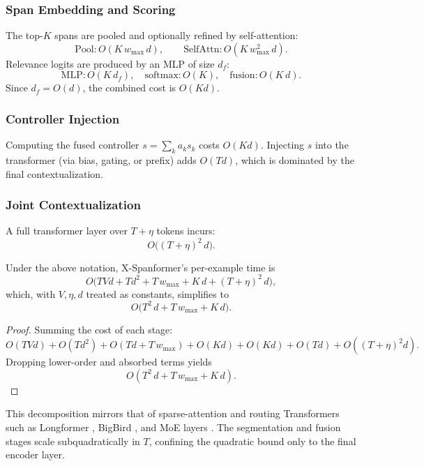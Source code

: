 \subsubsection{Span Embedding and Scoring}

The top-\(K\) spans are pooled and optionally refined by self-attention:
\[
\mathrm{Pool}: O(K\,w_{\max}\,d), 
\qquad
\mathrm{SelfAttn}: O(K\,w_{\max}^2\,d).
\]
Relevance logits are produced by an MLP of size \(d_f\):
\[
\mathrm{MLP}: O(K\,d_f), 
\quad
\mathrm{softmax}: O(K), 
\quad
\mathrm{fusion}: O(K\,d).
\]
Since \(d_f = O(d)\), the combined cost is \(O(Kd)\).

\subsubsection{Controller Injection}

Computing the fused controller \(s=\sum_k a_k s_k\) costs \(O(Kd)\). Injecting \(s\) into the transformer (via bias, gating, or prefix) adds \(O(Td)\), which is dominated by the final contextualization.

\subsubsection{Joint Contextualization}

A full transformer layer over \(T+\eta\) tokens incurs:
\[
O\bigl((T+\eta)^2\,d\bigr).
\]

\begin{proposition}
	Under the above notation, X-Spanformer’s per-example time is
	\[
	O\bigl(TVd + Td^2 + T\,w_{\max} + K\,d + (T+\eta)^2\,d\bigr),
	\]
	which, with \(V,\eta,d\) treated as constants, simplifies to
	\[
	O\bigl(T^2\,d + T\,w_{\max} + K\,d\bigr).
	\]
\end{proposition}

\begin{proof}
	Summing the cost of each stage:
	\[
	O(TVd) + O(Td^2) + O(Td + T\,w_{\max}) + O(Kd) + O(Kd) + O(Td) + O((T+\eta)^2d).
	\]
	Dropping lower-order and absorbed terms yields
	\[
	O(T^2\,d + T\,w_{\max} + K\,d).
	\]
\end{proof}

This decomposition mirrors that of sparse-attention and routing Transformers such as Longformer \cite{beltagy2020longformer}, BigBird \cite{zaheer2020bigbird}, and MoE layers \cite{shazeer2017outrageously,ainslie2023transformers}. The segmentation and fusion stages scale subquadratically in \(T\), confining the quadratic bound only to the final encoder layer.